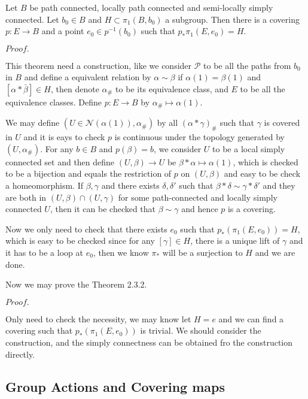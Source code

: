 \documentclass{article}
\newcommand{\Pf}[1]{$Proof.$\par}
\begin{document}
\begin{theorem}
    Let $B$ be path connected, locally path connected and semi-locally simply connected. Let $b_0 \in B$ and $H\subset \pi_1(B,b_0)$ a subgroup. Then there is a covering $p:E\to B$ and a point $e_0 \in p^{-1}(b_0)$ such that $p_*\pi_1(E,e_0) = H$.
\end{theorem}
\Pf\par
    This theorem need a construction, like we consider $\mathcal{P}$ to be all the paths from $b_0$ in $B$ and define a equivalent relation by $\alpha \sim \beta$ if $\alpha(1) = \beta (1)$ and $[\alpha*\bar{\beta}]\in H$, then denote $\alpha_{\#}$ to be its equivalence class, and $E$ to be all the equivalence classes. Define $p:E\to B$ by $\alpha_{\#} \mapsto \alpha(1)$.\par
    We may define $(U\in \mathcal{N}(\alpha(1)),\alpha_{\#})$ by all $(\alpha*\gamma)_{\#}$ such that $\gamma$ is covered in $U$ and it is eays to check $p$ is continuous under the topology generated by $(U,\alpha_{\#})$. For any $b \in B$ and $p(\beta) = b$, we consider $U$ to be a local simply connected set and then define $(U,\beta) \to U$ be $\beta * \alpha \mapsto \alpha(1)$, which is checked to be a bijection and equals the restriction of $p$ on $(U,\beta)$ and easy to be check a homeomorphism. If $\beta, \gamma$ and there exists $\delta,\delta'$ such that $\beta* \delta \sim \gamma * \delta'$ and they are both in $(U,\beta)\cap (U,\gamma)$ for some path-connected and locally simply connected $U$, then it can be checked that $\beta \sim \gamma$ and hence $p$ is a covering.\par
    Now we only need to check that there exists $e_0$ such that $p_*(\pi_1(E,e_0)) = H$, which is easy to be checked since for any $[\gamma] \in H$, there is a unique lift of $\gamma$ and it has to be a loop at $e_0$, then we know $\pi_*$ will be a surjection to $H$ and we are done.

Now we may prove the Theorem 2.3.2.\par
\Pf\par
Only need to check the necessity, we may know let $H = e$ and we can find a covering such that $p_*(\pi_1(E,e_0))$ is trivial. We should consider the construction, and the simply connectness can be obtained fro the construction directly.

\subsection{Group Actions and Covering maps}
\end{document}
